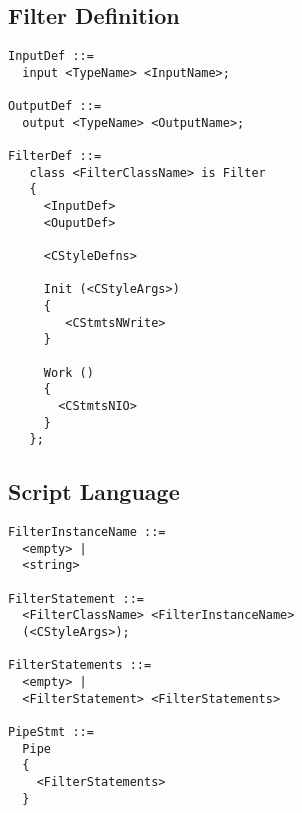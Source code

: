 \subsection{Filter Definition}

\begin{verbatim}
InputDef ::=
  input <TypeName> <InputName>;

OutputDef ::=
  output <TypeName> <OutputName>;

FilterDef ::= 
   class <FilterClassName> is Filter
   {
     <InputDef>
     <OuputDef>

     <CStyleDefns>

     Init (<CStyleArgs>)
     {
     	<CStmtsNWrite>
     }

     Work ()
     {
       <CStmtsNIO>
     }
   };
\end{verbatim}

\subsection{Script Language}

\begin{verbatim}
FilterInstanceName ::=
  <empty> |
  <string>

FilterStatement ::=
  <FilterClassName> <FilterInstanceName> 
  (<CStyleArgs>);

FilterStatements ::=
  <empty> |
  <FilterStatement> <FilterStatements>

PipeStmt ::=
  Pipe
  {
    <FilterStatements>
  }
\end{verbatim}




